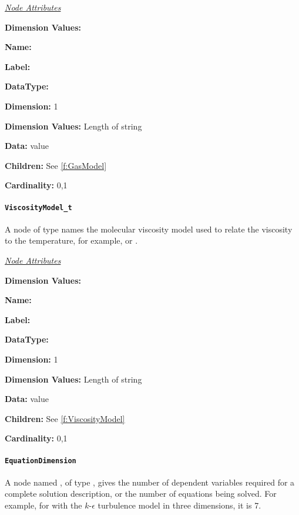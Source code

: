 \textit{\uline{Node Attributes}}
\begin{Ventryic}{\textbf{Dimension Values:}}
\item [\textbf{Name:}]
\item [\textbf{Label:}]
\item [\textbf{DataType:}]
\item [\textbf{Dimension:}]
      1
\item [\textbf{Dimension Values:}]
      Length of string
\item [\textbf{Data:}]
       value
\item [\textbf{Children:}]
      See \autoref{f:GasModel}
\item [\textbf{Cardinality:}]
      0,1
\end{Ventryic}

\paragraph{\texttt{ViscosityModel\_t}}

A node of type  names the molecular viscosity
model used to relate the viscosity to the temperature, for example,
 or .

\textit{\uline{Node Attributes}}
\begin{Ventryic}{\textbf{Dimension Values:}}
\item [\textbf{Name:}]
\item [\textbf{Label:}]
\item [\textbf{DataType:}]
\item [\textbf{Dimension:}]
      1
\item [\textbf{Dimension Values:}]
      Length of string
\item [\textbf{Data:}]
       value
\item [\textbf{Children:}]
      See \autoref{f:ViscosityModel}
\item [\textbf{Cardinality:}]
      0,1
\end{Ventryic}

\paragraph{\texttt{EquationDimension}}

A node named , of type , gives the
number of dependent variables required for a complete solution
description, or the number of equations being solved. For example, for
 with the $k$-$\epsilon$ turbulence model in three
dimensions, it is 7.

